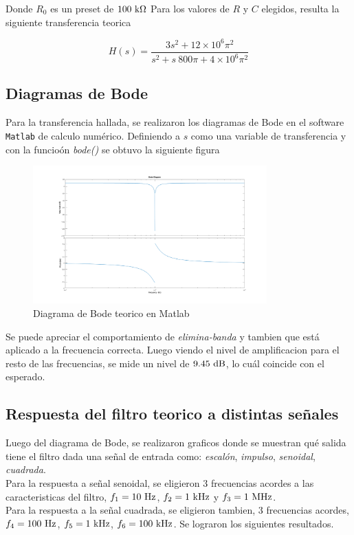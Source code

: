 Donde $R_0$ es un preset de $100 \ \si{\kilo\ohm}$
Para los valores de $R$ y $C$ elegidos, resulta la siguiente transferencia teorica

\begin{equation}
	H(s)=\frac{3s^2+12\times10^6 \pi^2}{s^2+s\ 800\pi+ 4\times10^6 \pi^2}
\end{equation}

\subsection*{Diagramas de Bode}
Para la transferencia hallada, se realizaron los diagramas de Bode en el software \texttt{Matlab} de calculo num\'erico. Definiendo a $s$  como una variable de transferencia y con la funcio\'on \textit{bode()} se obtuvo la siguiente figura\\
\begin{figure}[h]
	\centering
	\includegraphics[width=9cm]{imagenes/BodeTeorico}	\caption{Diagrama de Bode teorico en Matlab}
\end{figure}

Se puede apreciar el comportamiento de \textit{elimina-banda} y tambien que est\'a aplicado a la frecuencia correcta. Luego viendo el nivel de amplificacion para el resto de las frecuencias, se mide un nivel de $9.45 \dB$, lo cu\'al coincide con el esperado.
\subsection*{Respuesta del filtro teorico a distintas señales}
Luego del diagrama de Bode, se realizaron graficos donde se muestran qu\'e salida tiene el filtro dada una señal de entrada como: \textit{escal\'on}, \textit{impulso}, \textit{senoidal}, \textit{cuadrada}.\\
Para la respuesta a señal senoidal, se  eligieron 3 frecuencias  acordes a las caracteristicas del filtro, $f_1=  10 \ \si{\hertz}$, $f_2= 1\ \si{\kilo\hertz}$ y $f_3 = 1 \ \si{\mega\hertz}$.\\
Para la respuesta a la señal cuadrada, se eligieron tambien,  3 frecuencias acordes, $f_4 = 100 \ \si{\hertz}$, $f_5 = 1\ \si{\kilo\hertz}$, $f_6 = 100 \ \si{\kilo\hertz}$.
Se lograron los siguientes resultados.\\

